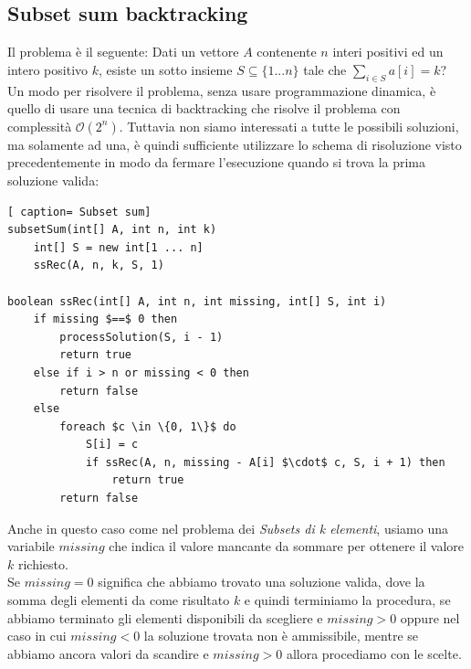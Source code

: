 \documentclass[../cheatSheetAlgoritmi.tex]{subfiles}
\begin{document}
\subsection{Subset sum backtracking}
Il problema è il seguente: Dati un vettore $A$ contenente $n$ interi positivi ed un intero positivo $k$, esiste un sotto insieme $S \subseteq \{1. . . n\}$ tale che $\sum_{i \in S} a[i] = k$? \\
Un modo per risolvere il problema, senza usare programmazione dinamica, è quello di usare una tecnica di backtracking che risolve il problema con complessità $\mathcal{O}(2^n)$. Tuttavia non siamo interessati a tutte le possibili soluzioni, ma solamente ad una, è quindi sufficiente utilizzare lo schema di risoluzione visto precedentemente in modo da fermare l'esecuzione quando si trova la prima soluzione valida:
 \begin{lstlisting}[ caption= Subset sum]
subsetSum(int[] A, int n, int k)
	int[] S = new int[1 ... n]
	ssRec(A, n, k, S, 1)

boolean ssRec(int[] A, int n, int missing, int[] S, int i)
	if missing $==$ 0 then
		processSolution(S, i - 1)
		return true
	else if i > n or missing < 0 then
		return false
	else 
		foreach $c \in \{0, 1\}$ do
			S[i] = c
			if ssRec(A, n, missing - A[i] $\cdot$ c, S, i + 1) then
				return true
		return false
\end{lstlisting}
Anche in questo caso come nel problema dei \emph{Subsets di k elementi}, usiamo una variabile $missing$ che indica il valore mancante da sommare per ottenere il valore $k$ richiesto. \\
Se $missing = 0$ significa che abbiamo trovato una soluzione valida, dove la somma degli elementi da come risultato $k$ e quindi terminiamo la procedura, se abbiamo terminato gli elementi disponibili da scegliere e $missing > 0$ oppure nel caso in cui $missing < 0$ la soluzione trovata non è ammissibile, mentre se abbiamo ancora valori da scandire e $missing > 0$ allora procediamo con le scelte.
\end{document}
